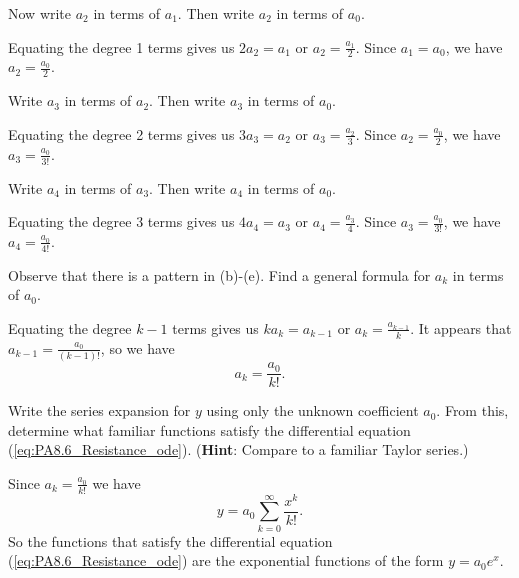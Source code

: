 \begin{pa}
\begin{activitySolution}
\end{activitySolution}

    \item Now write $a_2$ in terms of $a_1$. Then write $a_2$ in terms of $a_0$.

\begin{activitySolution}

Equating the degree 1 terms gives us $2a_2 = a_1$ or $a_2 = \frac{a_1}{2}$. Since $a_1 = a_0$, we have $a_2 = \frac{a_0}{2}$.

\end{activitySolution}

   \item Write $a_3$ in terms of $a_2$. Then write $a_3$ in terms of $a_0$.

\begin{activitySolution}

Equating the degree 2 terms gives us $3a_3 = a_2$ or $a_3 = \frac{a_2}{3}$. Since $a_2 = \frac{a_0}{2}$, we have $a_3 = \frac{a_0}{3!}$.

\end{activitySolution}

   \item Write $a_4$ in terms of $a_3$. Then write $a_4$ in terms of $a_0$.

\begin{activitySolution}

Equating the degree 3 terms gives us $4a_4 = a_3$ or $a_4 = \frac{a_3}{4}$. Since $a_3 = \frac{a_0}{3!}$, we have $a_4 = \frac{a_0}{4!}$.

\end{activitySolution}

    \item Observe that there is a pattern in (b)-(e). Find a general formula for $a_k$ in terms of $a_0$.

\begin{activitySolution}

Equating the degree $k-1$ terms gives us $ka_k = a_{k-1}$ or $a_k = \frac{a_{k-1}}{k}$. It appears that $a_{k-1} = \frac{a_0}{(k-1)!}$, so we have
\[a_k = \frac{a_0}{k!}.\]

\end{activitySolution}

\item Write the series expansion for $y$ using only the unknown coefficient $a_0$. From this, determine what familiar functions satisfy the differential equation (\ref{eq:PA8.6_Resistance_ode}). ({\bf Hint}: Compare to a familiar Taylor series.)

\begin{activitySolution}

Since $a_k = \frac{a_0}{k!}$ we have
\[y = a_0 \sum_{k=0}^{\infty} \frac{x^k}{k!}.\]
So the functions that satisfy the differential equation (\ref{eq:PA8.6_Resistance_ode}) are the exponential functions of the form $y = a_0e^x$.

\end{activitySolution}

\ea


\end{pa}
\afterpa 